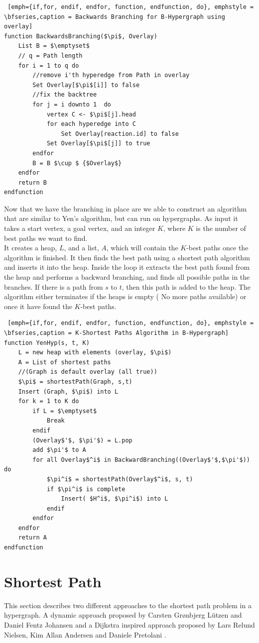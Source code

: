\documentclass[a4paper,10pt,titlepage]{paper}
\begin{document}
\begin{lstlisting} [emph={if,for, endif, endfor, function, endfunction, do}, emphstyle = \bfseries,caption = Backwards Branching for B-Hypergraph using overlay]
function BackwardsBranching($\pi$, Overlay) 						
	List B = $\emptyset$
	// q = Path length
	for i = 1 to q do			
		//remove i'th hyperedge from Path in overlay					
		Set Overlay[$\pi$[i]] to false		
		//fix the backtree				
		for j = i downto 1	do							
			vertex C <- $\pi$[j].head
			for each hyperedge into C
				Set Overlay[reaction.id] to false
			Set Overlay[$\pi$[j]] to true
		endfor
		B = B $\cup $ {$Overlay$}
	endfor
	return B
endfunction
\end{lstlisting}
Now that we have the branching in place are we able to construct an algorithm that are similar to Yen's algorithm, but can run on hypergraphs. As input it takes a start vertex, a goal vertex, and an integer $K$, where $K$ is the number of best paths we want to find.\\
It creates a heap, $L$, and a list, $A$, which will contain the $K$-best paths once the algorithm is finished. It then finds the best path using a shortest path algorithm and inserts it into the heap. Inside the loop it extracts the best path found from the heap and performs a backward branching, and finds all possible paths in the branches. If there is a path from $s$ to $t$, then this path is added to the heap. The algorithm either terminates if the heaps is empty ( No more paths available) or once it have found the $K$-best paths.
\begin{lstlisting} [emph={if,for, endif, endfor, function, endfunction, do}, emphstyle = \bfseries,caption = K-Shortest Paths Algorithm in B-Hypergraph]
function YenHyp(s, t, K) 
	L = new heap with elements (overlay, $\pi$)
	A = List of shortest paths
	//(Graph is default overlay (all true))
	$\pi$ = shortestPath(Graph, s,t) 				
	Insert (Graph, $\pi$) into L
	for k = 1 to K do
		if L = $\emptyset$
			Break
		endif
		(Overlay$'$, $\pi'$) = L.pop
		add $\pi'$ to A
		for all Overlay$^i$ in BackwardBranching((Overlay$'$,$\pi'$)) do
			$\pi^i$ = shortestPath(Overlay$^i$, s, t)
			if $\pi^i$ is complete
				Insert( $H^i$, $\pi^i$) into L
			endif
		endfor
	endfor
	return A
endfunction
\end{lstlisting}
\section{Shortest Path}
This section describes two different approaches to the shortest path problem in a hypergraph. A dynamic approach proposed by Carsten Grønbjerg Lützen and Daniel Fentz Johansen \cite{Carsten} and a Dijkstra inspired approach proposed by Lars Relund Nielsen, Kim Allan Andersen and Daniele Pretolani \cite{Nielsen}. 
\end{document}
